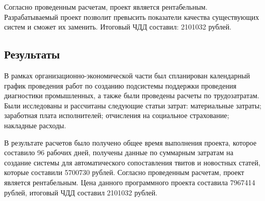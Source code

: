         Согласно проведенным расчетам, проект является рентабельным.
        Разрабатываемый проект позволит превысить показатели качества существующих систем и сможет их заменить.
        Итоговый ЧДД составил: 2101032 рублей.

    \subsection{Результаты}
        В рамках организационно-экономической части был спланирован календарный график проведения работ по созданию подсистемы поддержки проведения диагностики промышленных, а также были проведены расчеты по трудозатратам.
        Были исследованы и рассчитаны следующие статьи затрат: материальные затраты; заработная плата исполнителей; отчисления на социальное страхование; накладные расходы.

        В результате расчетов было получено общее время выполнения проекта, которое составило 96 рабочих дней,
        получены данные по суммарным затратам на создание системы для автоматического сопоставления твитов и новостных статей, которые составили 5700730 рублей.
        Согласно проведенным расчетам, проект является рентабельным.
        Цена данного программного проекта составила 7967414 рублей, итоговый ЧДД составил 2101032 рублей.

